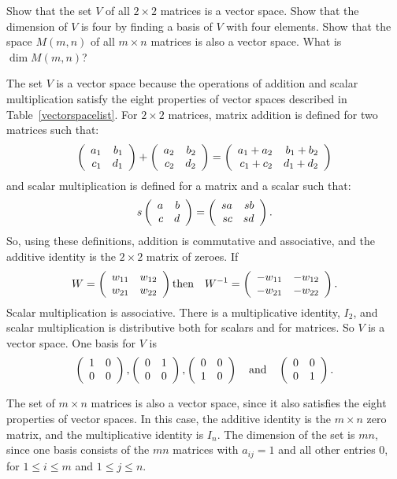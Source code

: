 \documentclass{ximera}
\begin{document}
\begin{exercise} \label{c5.5.4}
Show that the set $V$ of all $2\times 2$ matrices is a vector space.
Show that the dimension of $V$ is four by finding a basis of $V$
with four elements.  Show that the space $M(m,n)$ of all $m\times n$
matrices is also a vector space.  What is $\dim M(m,n)$?

\begin{solution}

The set $V$ is a vector space because the operations of addition and
scalar multiplication satisfy the eight properties of
vector spaces described in Table~\ref{vectorspacelist}.  For $2 \times
2$ matrices, matrix addition is defined for two matrices such that:
\[
\left(\begin{array}{rr} a_1 & b_1\\ c_1 &d_1\end{array}\right) + \left(\begin{array}{rr} a_2 & b_2\\ c_2 &d_2\end{array}\right) =
\left(\begin{array}{rr} a_1 + a_2 & b_1 + b_2\\ c_1 + c_2 &d_1 + d_2\end{array}\right)
\]
and scalar multiplication is defined for a matrix and a scalar such that:
\[
s\left(\begin{array}{rr} a & b\\ c &d\end{array}\right) = \left(\begin{array}{rr} sa & sb\\ sc &sd\end{array}\right).
\]
So, using these definitions, addition is commutative and associative,
and the additive identity is the $2 \times 2$ matrix of zeroes.  If
\[
W = \left(\begin{array}{rr} w_{11} & w_{12}\\ w_{21} &w_{22}\end{array}\right) \mbox{then}
\quad W^{-1} = \left(\begin{array}{rr} -w_{11} & -w_{12}\\ -w_{21} &-w_{22}\end{array}\right).
\]
Scalar multiplication is associative.  There is a multiplicative
identity, $I_2$, and scalar multiplication is distributive both
for scalars and for matrices.  So $V$ is a vector space.  One basis
for $V$ is
\[
\left(\begin{array}{rr} 1 & 0\\ 0 &0\end{array}\right), \left(\begin{array}{rr} 0 & 1\\ 0 &0\end{array}\right), \left(\begin{array}{rr} 0 & 0\\ 1 &0\end{array}\right)
\quad\mbox{and}\quad \left(\begin{array}{rr} 0 & 0\\ 0 &1\end{array}\right).
\]

\para The set of $m \times n$ matrices is also a vector space, since
it also satisfies the eight properties of vector spaces.  In this
case, the additive identity is the $m \times n$ zero matrix, and
the multiplicative identity is $I_n$.  The dimension of the set is
$mn$, since one basis consists of the $mn$ matrices with $a_{ij}
= 1$ and all other entries $0$, for $1 \leq i \leq m$ and $1 \leq j
\leq n$.

\end{solution}
\end{exercise}
\end{document}
